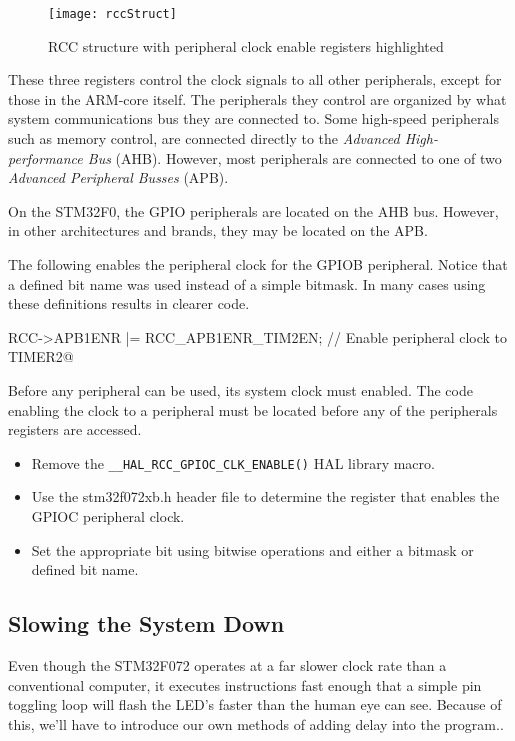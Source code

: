 \documentclass[11pt,fleqn]{book} %
\makeatletter
\newcommand{\ilcode}[1]{
    \smallskip
    \colorbox{gray!20!white}{
        \centering
        \parbox{\linewidth-2\fboxsep}{
            \lstinline@#1@
        }
    }
}
\makeatother
\begin{document}
\begin{figure}[]
    \centering\texttt{[image: rccStruct]}
    \caption{RCC structure with peripheral clock enable registers highlighted}
    \label{rccStruct}
\end{figure}

These three registers control the clock signals to all other peripherals, except for those in the ARM-core itself. The peripherals they control are organized by what system communications bus they are connected to. Some high-speed peripherals such as memory control, are connected directly to the \textit{Advanced High-performance Bus} (AHB). However, most peripherals are connected to one of two \textit{Advanced Peripheral Busses} (APB).

On the STM32F0, the GPIO peripherals are located on the AHB bus. However, in other architectures and brands, they may be located on the APB.

\begin{example}
    The following enables the peripheral clock for the GPIOB peripheral. Notice that a defined bit name was used instead of a simple bitmask. In many cases using these definitions results in clearer code.

    \ilcode{RCC->APB1ENR |= RCC\_APB1ENR\_TIM2EN;    // Enable peripheral clock to TIMER2}
    \smallskip
\end{example}

\begin{exercise} Before any peripheral can be used, its system clock must enabled. The code enabling the clock to a peripheral must be located before any of the peripherals registers are accessed. 
    \label{ex5}
    \begin{itemize}
        \item Remove the \texttt{\_\_HAL\_RCC\_GPIOC\_CLK\_ENABLE()} HAL library macro.
        \item Use the stm32f072xb.h header file to determine the register that enables the GPIOC peripheral clock.
        \item Set the appropriate bit using bitwise operations and either a bitmask or defined bit name. 
    \end{itemize}
\end{exercise}

\subsection{Slowing the System Down}
Even though the STM32F072 operates at a far slower clock rate than a conventional computer, it executes instructions fast enough that a simple pin toggling loop will flash the LED's faster than the human eye can see. Because of this, we'll have to introduce our own methods of adding delay into the program..
\end{document}
